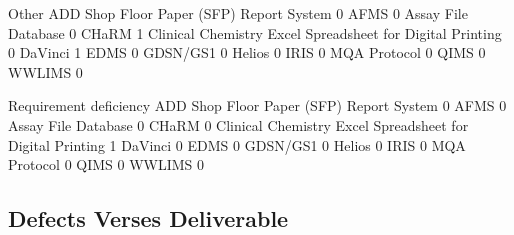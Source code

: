 \documentclass{article}
\begin{document}
\begin{Schunk}
\begin{Soutput}
                                                            Other
  ADD Shop Floor Paper (SFP) Report System                      0
  AFMS                                                          0
  Assay File Database                                           0
  CHaRM                                                         1
  Clinical Chemistry Excel Spreadsheet for Digital Printing     0
  DaVinci                                                       1
  EDMS                                                          0
  GDSN/GS1                                                      0
  Helios                                                        0
  IRIS                                                          0
  MQA Protocol                                                  0
  QIMS                                                          0
  WWLIMS                                                        0
                                                           
                                                            Requirement deficiency
  ADD Shop Floor Paper (SFP) Report System                                       0
  AFMS                                                                           0
  Assay File Database                                                            0
  CHaRM                                                                          0
  Clinical Chemistry Excel Spreadsheet for Digital Printing                      1
  DaVinci                                                                        0
  EDMS                                                                           0
  GDSN/GS1                                                                       0
  Helios                                                                         0
  IRIS                                                                           0
  MQA Protocol                                                                   0
  QIMS                                                                           0
  WWLIMS                                                                         0
\end{Soutput}
\end{Schunk}

\subsection{Defects Verses Deliverable}
\end{document}
